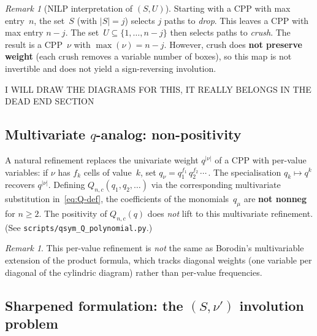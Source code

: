 \documentclass[11pt]{article}
\theoremstyle{plain}
\theoremstyle{definition}
\theoremstyle{remark}
\newtheorem{remark}[theorem]{Remark}
\begin{document}
\begin{remark}[NILP interpretation of $(S,U)$]
Starting with a CPP with max entry~$n$, the set~$S$ (with $|S|=j$)
selects $j$ paths to \emph{drop}.  This leaves a CPP with max entry
$n-j$.  The set~$U \subseteq \{1,\ldots,n-j\}$ then selects
paths to \emph{crush}.  The result is a CPP~$\nu$ with
$\max(\nu) = n - j$.  However, crush does \textbf{not preserve
weight} (each crush removes a variable number of boxes),
so this map is not invertible and does not yield a sign-reversing
involution.
\end{remark}

I WILL DRAW THE DIAGRAMS FOR THIS, IT REALLY BELONGS IN THE
DEAD END SECTION

\subsection{Multivariate $q$-analog: non-positivity}
\label{sec:multivariate-failure}

A natural refinement replaces the univariate weight $q^{|\nu|}$
of a CPP with per-value variables: if $\nu$ has $f_k$ cells of
value~$k$, set $q_\nu = q_1^{f_1}\, q_2^{f_2}\, \cdots\,$.
The specialisation $q_k \mapsto q^k$ recovers $q^{|\nu|}$.
Defining $Q_{n,c}(q_1, q_2, \ldots)$ via the corresponding
multivariate substitution in~\eqref{eq:Q-def}, the coefficients
of the monomials~$q_\mu$ are \textbf{not nonneg} for $n \geq 2$.
The positivity of $Q_{n,c}(q)$ does \emph{not} lift to this
multivariate refinement.
(See \texttt{scripts/qsym\_Q\_polynomial.py}.)

\begin{remark}
This per-value refinement is \emph{not} the same as
Borodin's multivariable extension of the product formula,
which tracks diagonal weights (one variable per diagonal of the
cylindric diagram) rather than per-value frequencies.
\end{remark}

\subsection{Sharpened formulation: the $(S, \nu')$ involution problem}
\label{sec:two-level}
\end{document}
